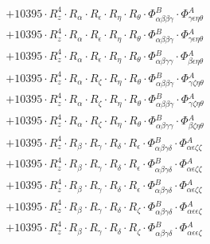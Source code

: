\documentclass{article}
\begin{document}
\begin{subequations}
\begin{gather}
\begin{array}{c}
 \\[0.2em] 		 + 10395 \cdot R_{z}^{4} \cdot R_{\alpha{}} \cdot R_{\epsilon{}} \cdot R_{\eta{}} \cdot R_{\theta{}} \cdot \Phi{}^{B}_{\alpha{}\beta{}\beta{}\gamma{}} \cdot \Phi{}^{A}_{\gamma{}\epsilon{}\eta{}\theta{}} 
 \\[0.2em] 		 + 10395 \cdot R_{z}^{4} \cdot R_{\alpha{}} \cdot R_{\epsilon{}} \cdot R_{\eta{}} \cdot R_{\theta{}} \cdot \Phi{}^{B}_{\alpha{}\beta{}\beta{}\gamma{}} \cdot \Phi{}^{A}_{\gamma{}\epsilon{}\eta{}\theta{}} 
 \\[0.2em] 		 + 10395 \cdot R_{z}^{4} \cdot R_{\alpha{}} \cdot R_{\epsilon{}} \cdot R_{\eta{}} \cdot R_{\theta{}} \cdot \Phi{}^{B}_{\alpha{}\beta{}\gamma{}\gamma{}} \cdot \Phi{}^{A}_{\beta{}\epsilon{}\eta{}\theta{}} 
 \\[0.2em] 		 + 10395 \cdot R_{z}^{4} \cdot R_{\alpha{}} \cdot R_{\zeta{}} \cdot R_{\eta{}} \cdot R_{\theta{}} \cdot \Phi{}^{B}_{\alpha{}\beta{}\beta{}\gamma{}} \cdot \Phi{}^{A}_{\gamma{}\zeta{}\eta{}\theta{}} 
 \\[0.2em] 		 + 10395 \cdot R_{z}^{4} \cdot R_{\alpha{}} \cdot R_{\zeta{}} \cdot R_{\eta{}} \cdot R_{\theta{}} \cdot \Phi{}^{B}_{\alpha{}\beta{}\beta{}\gamma{}} \cdot \Phi{}^{A}_{\gamma{}\zeta{}\eta{}\theta{}} 
 \\[0.2em] 		 + 10395 \cdot R_{z}^{4} \cdot R_{\alpha{}} \cdot R_{\zeta{}} \cdot R_{\eta{}} \cdot R_{\theta{}} \cdot \Phi{}^{B}_{\alpha{}\beta{}\gamma{}\gamma{}} \cdot \Phi{}^{A}_{\beta{}\zeta{}\eta{}\theta{}} 
 \\[0.2em] 		 + 10395 \cdot R_{z}^{4} \cdot R_{\beta{}} \cdot R_{\gamma{}} \cdot R_{\delta{}} \cdot R_{\epsilon{}} \cdot \Phi{}^{B}_{\alpha{}\beta{}\gamma{}\delta{}} \cdot \Phi{}^{A}_{\alpha{}\epsilon{}\zeta{}\zeta{}} 
 \\[0.2em] 		 + 10395 \cdot R_{z}^{4} \cdot R_{\beta{}} \cdot R_{\gamma{}} \cdot R_{\delta{}} \cdot R_{\epsilon{}} \cdot \Phi{}^{B}_{\alpha{}\beta{}\gamma{}\delta{}} \cdot \Phi{}^{A}_{\alpha{}\epsilon{}\zeta{}\zeta{}} 
 \\[0.2em] 		 + 10395 \cdot R_{z}^{4} \cdot R_{\beta{}} \cdot R_{\gamma{}} \cdot R_{\delta{}} \cdot R_{\epsilon{}} \cdot \Phi{}^{B}_{\alpha{}\beta{}\gamma{}\delta{}} \cdot \Phi{}^{A}_{\alpha{}\epsilon{}\zeta{}\zeta{}} 
 \\[0.2em] 		 + 10395 \cdot R_{z}^{4} \cdot R_{\beta{}} \cdot R_{\gamma{}} \cdot R_{\delta{}} \cdot R_{\zeta{}} \cdot \Phi{}^{B}_{\alpha{}\beta{}\gamma{}\delta{}} \cdot \Phi{}^{A}_{\alpha{}\epsilon{}\epsilon{}\zeta{}} 
 \\[0.2em] 		 + 10395 \cdot R_{z}^{4} \cdot R_{\beta{}} \cdot R_{\gamma{}} \cdot R_{\delta{}} \cdot R_{\zeta{}} \cdot \Phi{}^{B}_{\alpha{}\beta{}\gamma{}\delta{}} \cdot \Phi{}^{A}_{\alpha{}\epsilon{}\epsilon{}\zeta{}} 

\end{array}
\end{gather}
\end{subequations}
\end{document}
